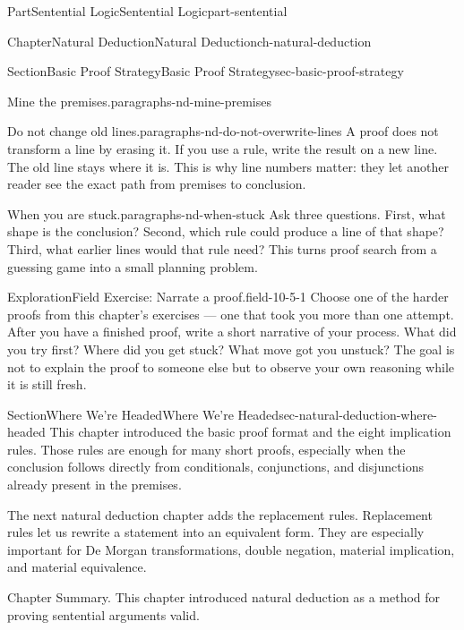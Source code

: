 \documentclass[oneside,10pt,]{book}
\begin{document}
\begin{partptx}{Part}{Sentential Logic}{}{Sentential Logic}{}{}{part-sentential}
\begin{chapterptx}{Chapter}{Natural Deduction}{}{Natural Deduction}{}{}{ch-natural-deduction}
\begin{sectionptx}{Section}{Basic Proof Strategy}{}{Basic Proof Strategy}{}{}{sec-basic-proof-strategy}
\begin{paragraphs}{Mine the premises.}{paragraphs-nd-mine-premises}
\end{paragraphs}%
\begin{paragraphs}{Do not change old lines.}{paragraphs-nd-do-not-overwrite-lines}%
A proof does not transform a line by erasing it. If you use a rule, write the result on a new line. The old line stays where it is. This is why line numbers matter: they let another reader see the exact path from premises to conclusion.%
\end{paragraphs}%
\begin{paragraphs}{When you are stuck.}{paragraphs-nd-when-stuck}%
Ask three questions. First, what shape is the conclusion? Second, which rule could produce a line of that shape? Third, what earlier lines would that rule need? This turns proof search from a guessing game into a small planning problem.%
\end{paragraphs}%
\begin{exploration}{Exploration}{Field Exercise: Narrate a proof.}{field-10-5-1}%
Choose one of the harder proofs from this chapter's exercises — one that took you more than one attempt. After you have a finished proof, write a short narrative of your process. What did you try first? Where did you get stuck? What move got you unstuck? The goal is not to explain the proof to someone else but to observe your own reasoning while it is still fresh.%
\end{exploration}%
\end{sectionptx}
%
%
\typeout{************************************************}
\typeout{************************************************}
%
\begin{sectionptx}{Section}{Where We're Headed}{}{Where We're Headed}{}{}{sec-natural-deduction-where-headed}
This chapter introduced the basic proof format and the eight implication rules. Those rules are enough for many short proofs, especially when the conclusion follows directly from conditionals, conjunctions, and disjunctions already present in the premises.%
\par
The next natural deduction chapter adds the replacement rules. Replacement rules let us rewrite a statement into an equivalent form. They are especially important for De Morgan transformations, double negation, material implication, and material equivalence.%
\end{sectionptx}
\begin{conclusion}{Chapter Summary.}%
This chapter introduced natural deduction as a method for proving sentential arguments valid.%
\par

\end{conclusion}
\end{chapterptx}
\end{partptx}
\end{document}
